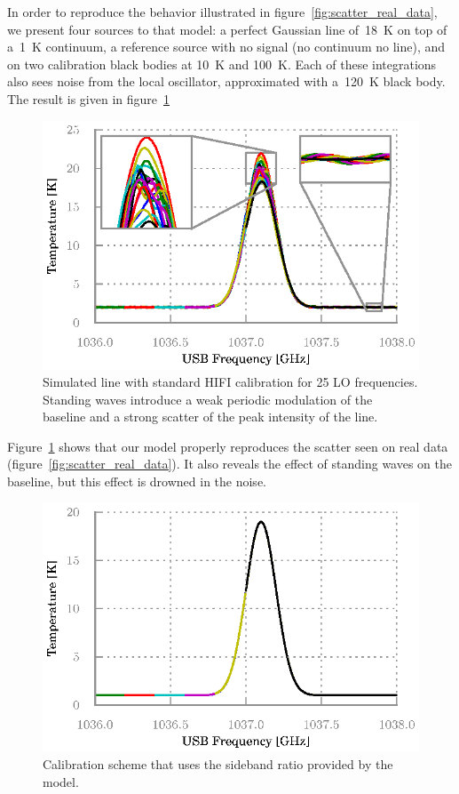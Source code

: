 \documentclass[a4paper,11pt]{article}
\begin{document}
In order to reproduce the behavior illustrated in figure~\ref{fig:scatter_real_data}, we present four sources to that model: a perfect Gaussian line of~\SI{18}{\kelvin} on top of a~\SI{1}{\kelvin} continuum, a reference source with no signal (no continuum no line), and on two calibration black bodies at \SI{10}{\kelvin} and \SI{100}{\kelvin}.
Each of these integrations also sees noise from the local oscillator, approximated with a~\SI{120}{\kelvin} black body.
The result is given in figure~\ref{fig:calibrated_std}
\begin{figure}[hbtp]
    \centering
    \includegraphics{bb-on_corrected-2}
    \caption{\label{fig:calibrated_std}Simulated line with standard HIFI calibration for 25 LO frequencies.
    Standing waves introduce a weak periodic modulation of the baseline and a strong scatter of the peak intensity of the line.}
\end{figure}
Figure~\ref{fig:calibrated_std} shows that our model properly reproduces the scatter seen on real data (figure~\ref{fig:scatter_real_data}).
It also reveals the effect of standing waves on the baseline, but this effect is drowned in the noise.

\begin{figure}
    \includegraphics[width=.45\textwidth]{bb-on_corrected-3}
    \caption{\label{fig:calibrated_sbr}Calibration scheme that uses the sideband ratio provided by the model.}
\end{figure}
\end{document}
